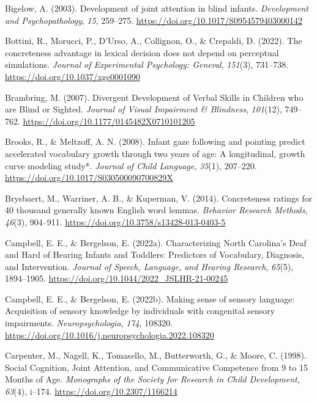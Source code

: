 \documentclass[english,man,floatsintext]{apa6}
\begin{document}
\leavevmode\hypertarget{ref-bigelow2003}{}%
Bigelow, A. (2003). Development of joint attention in blind infants. \emph{Development and Psychopathology}, \emph{15}, 259--275. \url{https://doi.org/10.1017/S0954579403000142}

\leavevmode\hypertarget{ref-bottini2022}{}%
Bottini, R., Morucci, P., D'Urso, A., Collignon, O., \& Crepaldi, D. (2022). The concreteness advantage in lexical decision does not depend on perceptual simulations. \emph{Journal of Experimental Psychology: General}, \emph{151}(3), 731--738. \url{https://doi.org/10.1037/xge0001090}

\leavevmode\hypertarget{ref-brambring2007}{}%
Brambring, M. (2007). Divergent Development of Verbal Skills in Children who are Blind or Sighted. \emph{Journal of Visual Impairment \& Blindness}, \emph{101}(12), 749--762. \url{https://doi.org/10.1177/0145482X0710101205}

\leavevmode\hypertarget{ref-brooks2008}{}%
Brooks, R., \& Meltzoff, A. N. (2008). Infant gaze following and pointing predict accelerated vocabulary growth through two years of age: A longitudinal, growth curve modeling study*. \emph{Journal of Child Language}, \emph{35}(1), 207--220. \url{https://doi.org/10.1017/S030500090700829X}

\leavevmode\hypertarget{ref-brysbaert2014}{}%
Brysbaert, M., Warriner, A. B., \& Kuperman, V. (2014). Concreteness ratings for 40 thousand generally known English word lemmas. \emph{Behavior Research Methods}, \emph{46}(3), 904--911. \url{https://doi.org/10.3758/s13428-013-0403-5}

\leavevmode\hypertarget{ref-campbell2022b}{}%
Campbell, E. E., \& Bergelson, E. (2022a). Characterizing North Carolina's Deaf and Hard of Hearing Infants and Toddlers: Predictors of Vocabulary, Diagnosis, and Intervention. \emph{Journal of Speech, Language, and Hearing Research}, \emph{65}(5), 1894--1905. \url{https://doi.org/10.1044/2022_JSLHR-21-00245}

\leavevmode\hypertarget{ref-campbell2022a}{}%
Campbell, E. E., \& Bergelson, E. (2022b). Making sense of sensory language: Acquisition of sensory knowledge by individuals with congenital sensory impairments. \emph{Neuropsychologia}, \emph{174}, 108320. \url{https://doi.org/10.1016/j.neuropsychologia.2022.108320}

\leavevmode\hypertarget{ref-carpenter1998}{}%
Carpenter, M., Nagell, K., Tomasello, M., Butterworth, G., \& Moore, C. (1998). Social Cognition, Joint Attention, and Communicative Competence from 9 to 15 Months of Age. \emph{Monographs of the Society for Research in Child Development}, \emph{63}(4), i--174. \url{https://doi.org/10.2307/1166214}
\end{document}
